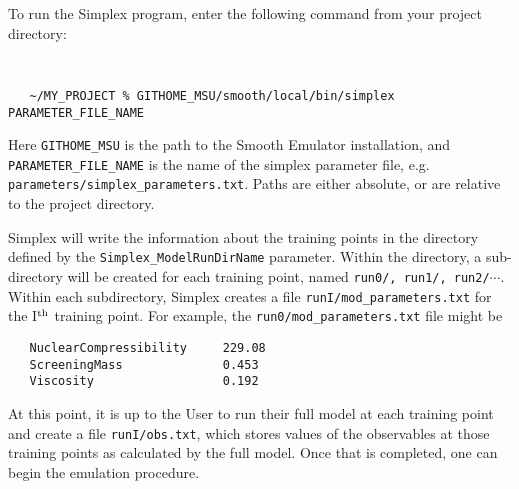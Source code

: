 \documentclass[main.tex]{subfiles}
\begin{document}
To run the Simplex program, enter the following command from your project directory:
{\tt
\begin{verbatim}
   ~/MY_PROJECT % GITHOME_MSU/smooth/local/bin/simplex PARAMETER_FILE_NAME
\end{verbatim}
}
Here {\tt GITHOME\_MSU} is the path to the Smooth Emulator installation, and {\tt PARAMETER\_FILE\_NAME} is the name of the simplex parameter file, e.g. {\tt parameters/simplex\_parameters.txt}. Paths are either absolute, or are relative to the project directory. 

Simplex will write the information about the training points in the directory defined by the {\tt Simplex\_ModelRunDirName} parameter. Within the directory, a sub-directory will be created for each training point, named {\tt run0/, run1/, run2/}$\cdots$. Within each subdirectory, Simplex creates a file {\tt runI/mod\_parameters.txt} for the I$^{\rm th}$ training point. For example, the {\tt run0/mod\_parameters.txt} file might be
{\tt\begin{verbatim}
   NuclearCompressibility     229.08
   ScreeningMass              0.453
   Viscosity                  0.192
\end{verbatim}
}
At this point, it is up to the User to run their full model at each training point and create a file {\tt runI/obs.txt}, which stores values of the observables at those training points as calculated by the full model. Once that is completed, one can begin the emulation procedure.
\end{document}

